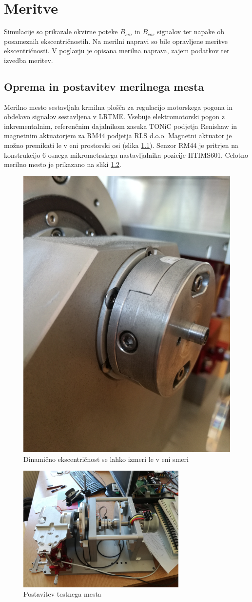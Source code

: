 \chapter{Meritve}
Simulacije so prikazale okvirne poteke $B_{sin}$ in $B_{cos}$ signalov ter napake  ob posameznih ekscentričnostih.
Na merilni napravi so bile opravljene meritve ekscentričnosti. V poglavju je opisana merilna naprava, zajem podatkov ter izvedba meritev.
\section{Oprema in postavitev merilnega mesta}
Merilno mesto sestavljala krmilna plošča za regulacijo motorskega pogona in obdelavo signalov sestavljena v LRTME.
Vsebuje elektromotorski pogon z inkrementalnim, referenčnim dajalnikom zasuka TONiC podjetja Renishaw in magnetnim aktuatorjem za RM44 podjetja RLS  d.o.o.
Magnetni aktuator je možno premikati le v eni prostorski osi (slika \ref{premikanjeMagneta}).
Senzor RM44 je pritrjen na konstrukcijo 6-osnega mikrometrskega nastavljalnika pozicije HTIMS601.
Celotno merilno mesto je prikazano na sliki \ref{postavitevmerilnegamesta.jpg}.
\begin{figure}[ht]
	\centering
	\includegraphics[width=0.4\columnwidth]{./Slike/premikanjeMagneta.jpg}
	\caption{Dinamično ekscentričnost se lahko izmeri le v eni smeri}
	\label{premikanjeMagneta}
\end{figure}
\begin{figure}[!ht]
	\centering
	\includegraphics[width=0.75\textwidth]{./Slike/postavitevmerilnegamesta.jpg}
	\caption{Postavitev testnega mesta}
	\label{postavitevmerilnegamesta.jpg}
\end{figure}
